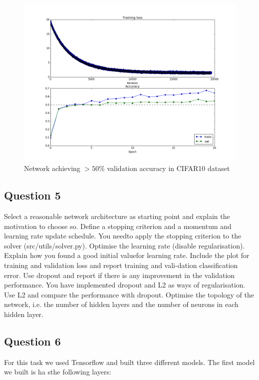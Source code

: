 \documentclass[12pt,twoside]{article}
\begin{document}
\begin{figure}[H]
\centering %
\includegraphics[width = 0.8\hsize]{./figures/cifar_2layer.png} %
\caption{Network achieving $>50\%$ validation accuracy in CIFAR10 dataset} %
\label{fig:cifar_2layer} %
\end{figure}

\subsection{Question 5}
Select a reasonable network architecture as starting point and explain the motivation to choose so. 
Define a stopping criterion and a momentum and learning rate update schedule. 
You needto apply the stopping criterion to the solver (src/utils/solver.py).
Optimise the learning rate (disable regularisation). 
Explain how you found a good initial valuefor learning rate. 
Include the plot for training and validation loss and report training and vali-dation classification error.
Use dropout and report if there is any improvement in the validation performance.
You have implemented dropout and L2 as ways of regularisation. 
Use L2 and compare the performance with dropout.
Optimise the topology of the network, i.e. the number of hidden layers and the number of neurons in each hidden layer.

\subsection{Question 6}
For this task we used Tensorflow and built three different models. The first model we built is ha sthe following layers:
\end{document}
